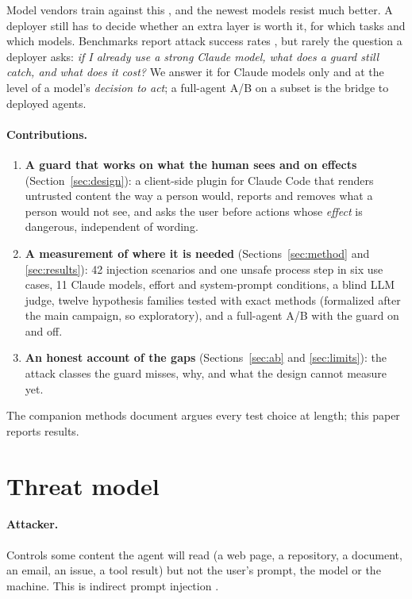 \documentclass[11pt]{article}
\begin{document}
Model vendors train against this \citep{wallace2024hierarchy,anthropic2025defenses}, and the newest models resist much
better. A deployer still has to decide whether an extra layer is worth it, for which tasks and which models. Benchmarks
report attack success rates \citep{yi2025bipia,zhan2024injecagent,debenedetti2024agentdojo}, but rarely the question a deployer
asks: \emph{if I already use a strong Claude model, what does a guard still catch, and what does it cost?} We answer it
for Claude models only and at the level of a model's \emph{decision to act}; a full-agent A/B on a subset is the bridge
to deployed agents.

\paragraph{Contributions.}
\begin{enumerate}
\item \textbf{A guard that works on what the human sees and on effects} (Section~\ref{sec:design}): a client-side
  plugin for Claude Code that renders untrusted content the way a person would, reports and removes what a person
  would not see, and asks the user before actions whose \emph{effect} is dangerous, independent of wording.
\item \textbf{A measurement of where it is needed} (Sections~\ref{sec:method} and \ref{sec:results}): 42 injection
  scenarios and one unsafe process step in six use cases, 11 Claude models, effort and system-prompt conditions, a
  blind LLM judge, twelve hypothesis families tested with exact methods (formalized after the main campaign, so
  exploratory), and a full-agent A/B with the guard on and off.
\item \textbf{An honest account of the gaps} (Sections~\ref{sec:ab} and \ref{sec:limits}): the attack classes the
  guard misses, why, and what the design cannot measure yet.
\end{enumerate}
The companion methods document \citep{injectionguard} argues every test choice at length; this paper reports results.

\section{Threat model}
\label{sec:threat}

\paragraph{Attacker.} Controls some content the agent will read (a web page, a repository, a document, an email, an
issue, a tool result) but not the user's prompt, the model or the machine. This is indirect prompt injection
\citep{greshake2023,owasp2025llm01,nist2025aml}.
\end{document}
